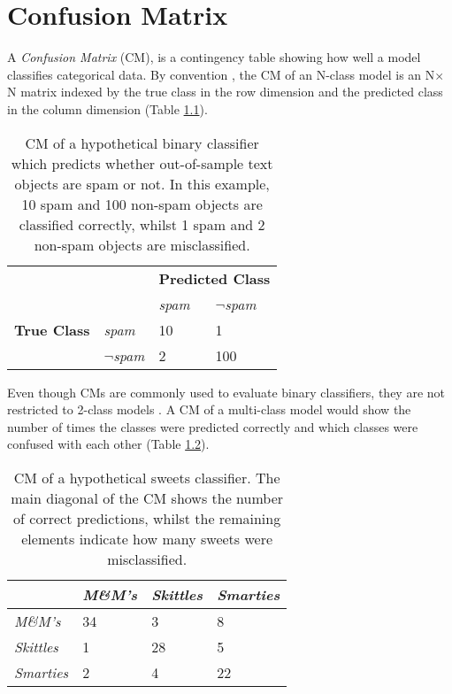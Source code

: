 \chapter{Confusion Matrix}
\label{ch:confusion-matrix}

A \textit{Confusion Matrix} (CM), is a contingency table showing how well a model classifies categorical data. By convention \citep{sammut2017encyclopedia}, the CM of an N-class model is an N$\times$N matrix indexed by the true class in the row dimension and the predicted class in the column dimension (Table \ref{tab:cm_spam}).

\begin{table}[ht]
  \centering
  \selectfont
  \begin{tabular}{llll}
    \toprule
                        &                     & \multicolumn{2}{c}{\textbf{Predicted Class}} \\
                        &                     & \textit{spam} & \textit{$\neg$spam} \\
    \midrule
    \textbf{True Class} & \textit{spam}       & 10           & 1 \\
                        & \textit{$\neg$spam} & 2            & 100 \\
    \bottomrule
  \end{tabular}
  \caption{CM of a hypothetical binary classifier which predicts whether out-of-sample text objects are spam or not. In this example, 10 spam and 100 non-spam objects are classified correctly, whilst 1 spam and 2 non-spam objects are misclassified.}
  \label{tab:cm_spam}
\end{table}
\vspace{2mm}

Even though CMs are commonly used to evaluate binary classifiers, they are not restricted to 2-class models \citep{martin2018speech}. A CM of a multi-class model would show the number of times the classes were predicted correctly and which classes were confused with each other (Table \ref{tab:cm_sweets}).

\begin{table}[ht]
  \centering
  \selectfont
  \begin{tabular}{llll}
    \toprule
                      & \textit{M\&M's} & \textit{Skittles} & \textit{Smarties} \\
    \midrule
    \textit{M\&M's}   & 34              & 3                 & 8  \\
    \textit{Skittles} & 1               & 28                & 5  \\
    \textit{Smarties} & 2               & 4                 & 22 \\
    \bottomrule
  \end{tabular}
  \caption{CM of a hypothetical sweets classifier. The main diagonal of the CM shows the number of correct predictions, whilst the remaining elements indicate how many sweets were misclassified.}
  \label{tab:cm_sweets}
\end{table}
\vspace{2mm}

